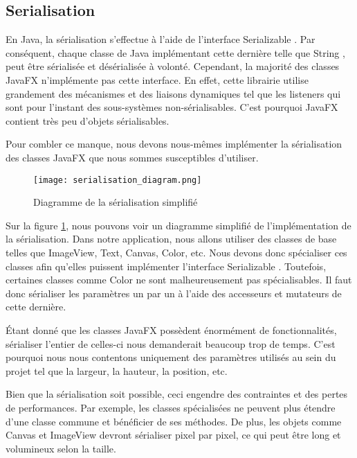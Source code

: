 \subsection{Serialisation}
\label{sec:serialisation}

En Java, la sérialisation s'effectue à l'aide de l'interface \og Serializable \fg{}. Par conséquent, chaque classe de Java implémentant cette dernière telle que \og String \fg{}, peut être sérialisée et désérialisée à volonté. Cependant, la majorité des classes JavaFX n'implémente pas cette interface. En effet, cette librairie utilise grandement des mécanismes et des liaisons dynamiques tel que les listeners qui sont pour l'instant des sous-systèmes non-sérialisables. C'est pourquoi JavaFX contient très peu d'objets sérialisables.

Pour combler ce manque, nous devons nous-mêmes implémenter la sérialisation des classes JavaFX que nous sommes susceptibles d'utiliser.

\begin{figure}[h]
    \caption{Diagramme de la sérialisation simplifié}
    \centering
    \texttt{[image: serialisation\_diagram.png]}
    \label{fig:seri_diag}
\end{figure}

Sur la figure \ref{fig:seri_diag}, nous pouvons voir un diagramme simplifié de l'implémentation de la sérialisation. Dans notre application, nous allons utiliser des classes de base telles que ImageView, Text, Canvas, Color, etc. Nous devons donc spécialiser ces classes afin qu'elles puissent implémenter l'interface \og Serializable \fg{}. Toutefois, certaines classes comme \og Color \fg{} ne sont malheureusement pas spécialisables. Il faut donc sérialiser les paramètres un par un à l'aide des accesseurs et mutateurs de cette dernière.

Étant donné que les classes JavaFX possèdent énormément de fonctionnalités, sérialiser l'entier de celles-ci nous demanderait beaucoup trop de temps. C'est pourquoi nous nous contentons uniquement des paramètres utilisés au sein du projet tel que la largeur, la hauteur, la position, etc.



Bien que la sérialisation soit possible, ceci engendre des contraintes et des pertes de performances. Par exemple, les classes spécialisées ne peuvent plus étendre d'une classe commune et bénéficier de ses méthodes. De plus, les objets comme Canvas et ImageView devront sérialiser pixel par pixel, ce qui peut être long et volumineux selon la taille.


